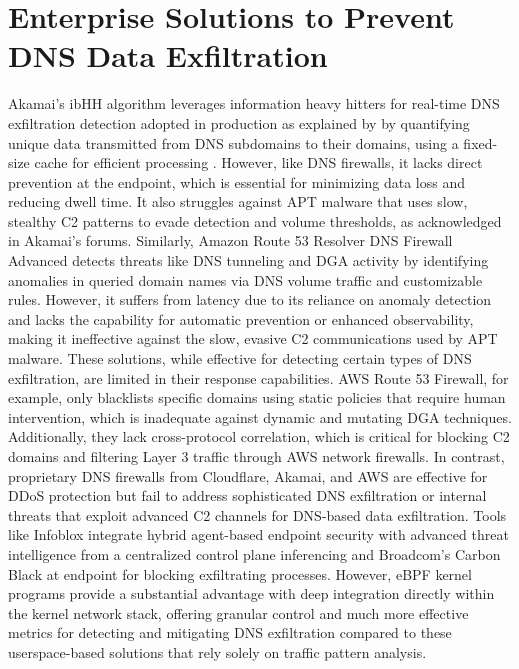 \documentclass [11pt, proquest] {uwthesis}[2020/02/24]
\begin{document}
\section{Enterprise Solutions to Prevent DNS Data Exfiltration}
Akamai’s ibHH algorithm leverages information heavy hitters for real-time DNS exfiltration detection adopted in production as explained by \citeauthor{ozery2023information} by quantifying unique data transmitted from DNS subdomains to their domains, using a fixed-size cache for efficient processing \cite{ozery2023information}. However, like DNS firewalls, it lacks direct prevention at the endpoint, which is essential for minimizing data loss and reducing dwell time. It also struggles against APT malware that uses slow, stealthy C2 patterns to evade detection and volume thresholds, as acknowledged in Akamai's forums. Similarly, Amazon Route 53 Resolver DNS Firewall Advanced detects threats like DNS tunneling and DGA activity by identifying anomalies in queried domain names via DNS volume traffic and customizable rules. However, it suffers from latency due to its reliance on anomaly detection and lacks the capability for automatic prevention or enhanced observability, making it ineffective against the slow, evasive C2 communications used by APT malware.  These solutions, while effective for detecting certain types of DNS exfiltration, are limited in their response capabilities. AWS Route 53 Firewall, for example, only blacklists specific domains using static policies that require human intervention, which is inadequate against dynamic and mutating DGA techniques. Additionally, they lack cross-protocol correlation, which is critical for blocking C2 domains and filtering Layer 3 traffic through AWS network firewalls.
In contrast, proprietary DNS firewalls from Cloudflare, Akamai, and AWS are effective for DDoS protection but fail to address sophisticated DNS exfiltration or internal threats that exploit advanced C2 channels for DNS-based data exfiltration. Tools like Infoblox integrate hybrid agent-based endpoint security with advanced threat intelligence from a centralized control plane inferencing and Broadcom’s Carbon Black at endpoint for blocking exfiltrating processes. However, eBPF kernel programs provide a substantial advantage with deep integration directly within the kernel network stack, offering granular control and much more effective metrics for detecting and mitigating DNS exfiltration compared to these userspace-based solutions that rely solely on traffic pattern analysis.

\end{document}
